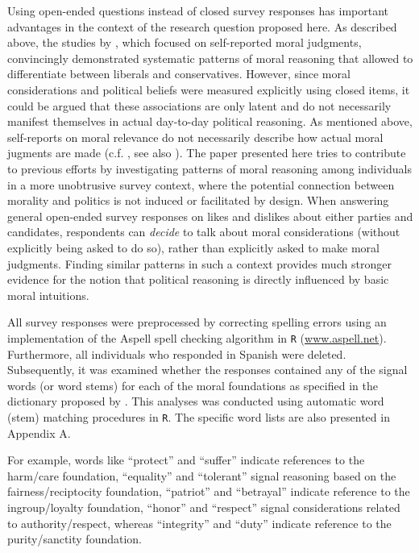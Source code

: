 \documentclass[12pt]{paper}
\begin{document}
Using open-ended questions instead of closed survey responses has important advantages in the context of the research question proposed here. As described above, the studies by \citet{graham2009liberals}, which focused on self-reported moral judgments, convincingly demonstrated systematic patterns of moral reasoning that allowed to differentiate between liberals and conservatives. However, since moral considerations and political beliefs were measured explicitly using closed items, it could be argued that these associations are only latent and do not necessarily manifest themselves in actual day-to-day political reasoning. As mentioned above, self-reports on moral relevance do not necessarily describe how actual moral jugments are made (c.f. \citealt[1031]{graham2009liberals}, see also \citealt{clifford2015moral}). The paper presented here tries to contribute to previous efforts by investigating patterns of moral reasoning among individuals in a more unobtrusive survey context, where the potential connection between morality and politics is not induced or facilitated by design. When answering general open-ended survey responses on likes and dislikes about either parties and candidates, respondents can \textit{decide} to talk about moral considerations (without explicitly being asked to do so), rather than explicitly asked to make moral judgments. Finding similar patterns in such a context provides much stronger evidence for the notion that political reasoning is directly influenced by basic moral intuitions.

All survey responses were preprocessed by correcting spelling errors using an implementation of the Aspell spell checking algorithm in \texttt{R} (\url{www.aspell.net}). Furthermore, all individuals who responded in Spanish were deleted. Subsequently, it was examined whether the responses contained any of the signal words (or word stems) for each of the moral foundations as specified in the dictionary proposed by \citet{graham2009liberals}. This analyses was conducted using automatic word (stem) matching procedures in \texttt{R}. The specific word lists are also presented in Appendix A. 

For example, words like ``protect'' and ``suffer'' indicate references to the harm/care foundation, ``equality'' and ``tolerant'' signal reasoning based on the fairness/reciptocity foundation, ``patriot'' and ``betrayal'' indicate reference to the ingroup/loyalty foundation, ``honor'' and ``respect'' signal considerations related to authority/respect, whereas ``integrity'' and ``duty'' indicate reference to the purity/sanctity foundation.
\end{document}
